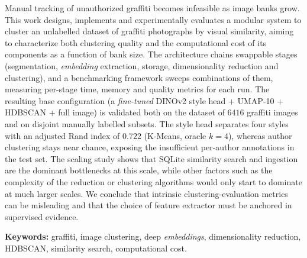 Manual tracking of unauthorized graffiti becomes infeasible as image banks
grow. This work designs, implements and experimentally evaluates a modular
system to cluster an unlabelled dataset of graffiti photographs by visual
similarity, aiming to characterize both clustering quality and the
computational cost of its components as a function of bank size. The
architecture chains swappable stages (segmentation, \textit{embedding}
extraction, storage, dimensionality reduction and clustering), and a
benchmarking framework sweeps combinations of them, measuring per-stage time,
memory and quality metrics for each run. The resulting base configuration (a
\textit{fine-tuned} DINOv2 style head + UMAP-10 + HDBSCAN + full image) is
validated both on the dataset of $6416$ graffiti images and on disjoint
manually labelled subsets. The style head separates four styles with an
adjusted Rand index of 0.722 (K-Means, oracle $k{=}4$), whereas author
clustering stays near chance, exposing the insufficient per-author annotations
in the test set. The scaling study shows that SQLite similarity search and
ingestion are the dominant bottlenecks at this scale, while other factors such
as the complexity of the reduction or clustering algorithms would only start to
dominate at much larger scales. We conclude that intrinsic
clustering-evaluation metrics can be misleading and that the choice of feature
extractor must be anchored in supervised evidence.

\textbf{Keywords:} graffiti, image clustering, deep \textit{embeddings},
dimensionality reduction, HDBSCAN, similarity search, computational cost.

